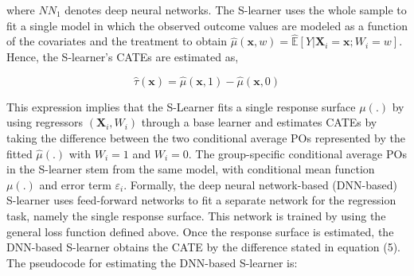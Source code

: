 \begin{table}[!h]
    \centering
\label{tab:pseudoT}
\end{table}

where \(NN_{1}\) denotes deep neural networks. The S-learner uses the
whole sample to fit a single model in which the observed outcome values
are modeled as a function of the covariates and the treatment to obtain
\(\widehat{\mu} \left(\mathbf{x},w\right)=\hat{\mathbb{E}}\left[Y|\mathbf{X}_{i} = \mathbf{x}; W_{i}=w\right].\)
Hence, the S-learner's CATEs are estimated as,

\begin{equation}
\widehat{\tau}\left(\mathbf{x}\right)=\widehat{\mu}\left(\mathbf{x},1\right)-\widehat{\mu}\left(\mathbf{x},0\right)
\end{equation}

This expression implies that the S-Learner fits a single response
surface \(\mu\left(.\right)\) by using regressors
\(\left(\mathbf{X}_{i}, W_{i}\right)\) through a base learner and
estimates CATEs by taking the difference between the two conditional
average POs represented by the fitted \(\widehat{\mu}\left(.\right)\) with
\(W_{i}=1\) and \(W_{i}=0\). The group-specific conditional average POs in
the S-learner stem from the same model, with conditional mean function
\(\mu\left(.\right)\) and error term \(\varepsilon_{i}\). Formally, the deep
neural network-based (DNN-based) S-learner uses feed-forward networks to
fit a separate network for the regression task, namely the single
response surface. This network is trained by using the general loss
function defined above. Once the response surface is estimated, the
DNN-based S-learner obtains the CATE by the difference stated in
equation (5). The pseudocode for estimating the DNN-based S-learner is:

